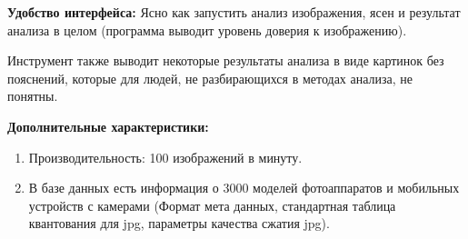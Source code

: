 \textbf{Удобство интерфейса:}
Ясно как запустить анализ изображения, ясен и результат анализа в целом (программа выводит уровень доверия к изображению).

Инструмент также выводит некоторые результаты анализа в виде картинок без пояснений, которые для людей, не разбирающихся в методах анализа, не понятны.
  
\textbf{Дополнительные характеристики:}
\begin{enumerate}
  \item	Производительность: 100 изображений в минуту.
  \item В базе данных есть информация о 3000 моделей фотоаппаратов и мобильных устройств с камерами (Формат мета данных, стандартная таблица квантования для jpg, параметры качества сжатия jpg).
\end{enumerate}


